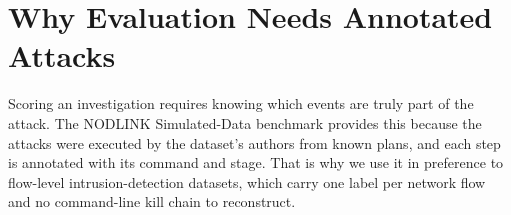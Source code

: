 \section{Why Evaluation Needs Annotated Attacks}
Scoring an investigation requires knowing which events are truly part of the attack. The NODLINK Simulated-Data benchmark provides this because the attacks were executed by the dataset's authors from known plans, and each step is annotated with its command and stage. That is why we use it in preference to flow-level intrusion-detection datasets, which carry one label per network flow and no command-line kill chain to reconstruct.

